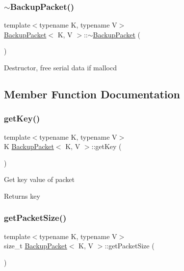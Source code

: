 \subsubsection{\texorpdfstring{$\sim$\+Backup\+Packet()}{~BackupPacket()}}
{\footnotesize\ttfamily template$<$typename K, typename V$>$ \\
\mbox{\hyperlink{classBackupPacket}{Backup\+Packet}}$<$ K, V $>$\+::$\sim$\mbox{\hyperlink{classBackupPacket}{Backup\+Packet}} (\begin{DoxyParamCaption}{ }\end{DoxyParamCaption})\hspace{0.3cm}{\ttfamily [inline]}}

Destructor, free serial data if malloc\textquotesingle{}d 

\subsection{Member Function Documentation}
\mbox{\label{classBackupPacket_a36d0369d548f537a12840627a9fabbfd}} 
\subsubsection{\texorpdfstring{get\+Key()}{getKey()}}
{\footnotesize\ttfamily template$<$typename K, typename V$>$ \\
K \mbox{\hyperlink{classBackupPacket}{Backup\+Packet}}$<$ K, V $>$\+::get\+Key (\begin{DoxyParamCaption}{ }\end{DoxyParamCaption})\hspace{0.3cm}{\ttfamily [inline]}}

Get key value of packet

\begin{DoxyReturn}{Returns}
key 
\end{DoxyReturn}
\mbox{\label{classBackupPacket_a3bdc1916566a9cffbdd26abe5c87bdad}} 
\subsubsection{\texorpdfstring{get\+Packet\+Size()}{getPacketSize()}}
{\footnotesize\ttfamily template$<$typename K, typename V$>$ \\
size\+\_\+t \mbox{\hyperlink{classBackupPacket}{Backup\+Packet}}$<$ K, V $>$\+::get\+Packet\+Size (\begin{DoxyParamCaption}{ }\end{DoxyParamCaption})\hspace{0.3cm}{\ttfamily [inline]}}

